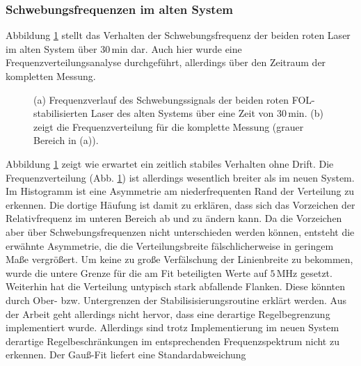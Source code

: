 \subsubsection{Schwebungsfrequenzen im alten
System}\label{subsubsec:beatfrequenzmessung_altes_system}
Abbildung \ref{fig:beatfrequenzen_alt_FOL} stellt das Verhalten der
Schwebungsfrequenz der beiden roten Laser im alten System über $30\,$min dar.
Auch hier wurde eine Frequenzverteilungsanalyse durchgeführt, allerdings über
den Zeitraum der kompletten Messung.
\begin{figure}[hp]
 	\centering
 	\footnotesize
 	\fbox{\parbox{\dimexpr \linewidth - 2\fboxrule - 2\fboxsep}{
 	\subfloat[]{
		\label{subfig:beatfrequenzen_alt_FOL_drift}
		
		}\\
 	\subfloat[]{
		\label{subfig:beatfrequenzen_alt_FOL_histogramm}
		
		}
	}}
	\caption[Beatfrequenzen - altes System mit FOL]{(a) Frequenzverlauf des
	Schwebungssignals der beiden roten FOL-stabilisierten Laser des alten Systems
	über eine Zeit von $30\,$min. (b) zeigt die Frequenzverteilung für die
	komplette Messung (grauer Bereich in (a)).}
	\label{fig:beatfrequenzen_alt_FOL}
\end{figure}
Abbildung
\ref{fig:beatfrequenzen_alt_FOL}
zeigt wie erwartet ein zeitlich stabiles Verhalten ohne Drift. Die
Frequenzverteilung (Abb.
\ref{fig:beatfrequenzen_alt_FOL})
ist allerdings wesentlich breiter als im neuen System. Im Histogramm ist eine Asymmetrie am niederfrequenten Rand der
Verteilung zu erkennen. Die dortige Häufung ist damit zu erklären, dass sich das Vorzeichen
der Relativfrequenz im unteren Bereich ab und zu ändern kann. Da die Vorzeichen
aber über Schwebungsfrequenzen nicht unterschieden werden können, entsteht die erwähnte
Asymmetrie, die die Verteilungsbreite fälschlicherweise in geringem Maße
vergrößert. Um keine zu große Verfälschung der Linienbreite zu bekommen, wurde die untere Grenze für die am
Fit beteiligten Werte auf $5\,$MHz gesetzt. Weiterhin hat die Verteilung
untypisch stark abfallende Flanken. Diese könnten durch Ober- bzw.
Untergrenzen der Stabilisisierungsroutine erklärt werden. Aus der Arbeit
\cite{kuschnick:2000:diplomarbeit} geht allerdings nicht hervor, dass eine
derartige Regelbegrenzung implementiert wurde. Allerdings sind trotz
Implementierung im neuen System derartige Regelbeschränkungen im entsprechenden
Frequenzspektrum nicht zu erkennen. Der Gauß-Fit liefert eine Standardabweichung
